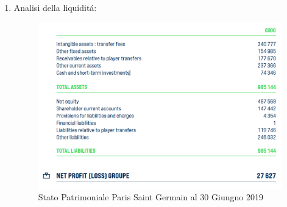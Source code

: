 \documentclass[
    corpo=12pt,
    oneside,
    evenboxes,
    tipotesi=triennale,
    stile=classica,
    oldstyle,
    autoretitolo,
    greek,
]{toptesi}
\begin{document}
\begin{interlinea}{1.5}
\begin{enumerate}
\begin{equation}
            \label{eqn: gare_psg}
        \end{equation}
        \begin{equation}
            \frac{\text{Diritti TV}}{\text{Totale Ricavi}} = \frac{156.632.000}{658.677.000} = \mathbf{23,77\%}
            \label{eqn: tv_psg}
        \end{equation}
        \begin{equation}
            \frac{\text{Ricavi commerciali}}{\text{Totale Ricavi}} = \frac{195.022.000}{658.677.000} = \mathbf{29,60\%}
            \label{eqn: commerc_psg}
        \end{equation}
        In questo scenario troviamo una situazione abbastanza differente. Sebbene il Paris Saint Germain sia molto seguita in Europa e nel
        mondo i ricavi da gare e diritti Tv sono inferiori (rapportati al Totale Incassi) rispetto a quelli della Juventus\footnote{https://www.lfp.fr/dncg/rapports}: questo perch\'e
        in Francia non troviamo una cos\'i radicata cultura calcistica, sopratutto per quanto riguarda i singoli club e, mancando di \emph{appeal}
        internazionale, il campionato francese non pu\'o contare molto sulla vendita della trasmissione delle partite. I Ricavi Commerciali invece
        sono leggermente superiori per il motivo appunto che data la grande importanza a livello mondiale del club, esso vende maggiormente in tutto il mondo.
    \item Analisi della liquidit\'a:\newline
        \begin{figure}
            \centering
            \includegraphics[scale=.5]{img/SP_psg.png}
            \caption{Stato Patrimoniale Paris Saint Germain al 30 Giungno 2019}

\end{figure}
\end{enumerate}
\end{interlinea}
\end{document}
